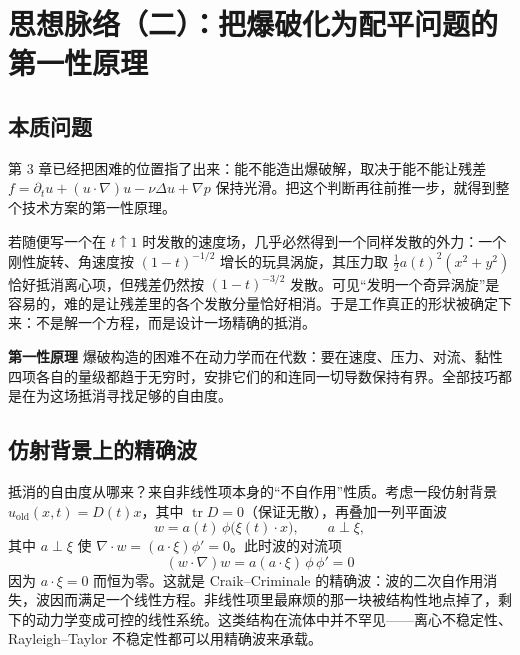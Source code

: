 
\section{思想脉络（二）：把爆破化为配平问题的第一性原理}

\subsection{本质问题}

第 3 章已经把困难的位置指了出来：能不能造出爆破解，取决于能不能让残差 $f=\partial_{t}u+(u\cdot\nabla)u-\nu\Delta u+\nabla p$ 保持光滑。把这个判断再往前推一步，就得到整个技术方案的第一性原理。

若随便写一个在 $t\uparrow1$ 时发散的速度场，几乎必然得到一个同样发散的外力：一个刚性旋转、角速度按 $(1-t)^{-1/2}$ 增长的玩具涡旋，其压力取 $\frac12 a(t)^{2}(x^{2}+y^{2})$ 恰好抵消离心项，但残差仍然按 $(1-t)^{-3/2}$ 发散。可见“发明一个奇异涡旋”是容易的，难的是让残差里的各个发散分量恰好相消。于是工作真正的形状被确定下来：不是解一个方程，而是设计一场精确的抵消。

\begin{keybox}
\textbf{第一性原理}\quad \NS{} 爆破构造的困难不在动力学而在代数：要在速度、压力、对流、黏性四项各自的量级都趋于无穷时，安排它们的和连同一切导数保持有界。全部技巧都是在为这场抵消寻找足够的自由度。
\end{keybox}

\subsection{仿射背景上的精确波}

抵消的自由度从哪来？来自非线性项本身的“不自作用”性质。考虑一段仿射背景 $u_{\text{old}}(x,t)=D(t)x$，其中 $\operatorname{tr}D=0$（保证无散），再叠加一列平面波
\begin{equation}
w=a(t)\,\phi\big(\xi(t)\cdot x\big),\qquad a\perp\xi,
\end{equation}
其中 $a\perp\xi$ 使 $\nabla\cdot w=(a\cdot\xi)\phi'=0$。此时波的对流项
\begin{equation}
(w\cdot\nabla)w=a(a\cdot\xi)\,\phi\,\phi'=0
\end{equation}
因为 $a\cdot\xi=0$ 而恒为零。这就是 Craik--Criminale 的精确波：波的二次自作用消失，波因而满足一个线性方程。非线性项里最麻烦的那一块被结构性地点掉了，剩下的动力学变成可控的线性系统。这类结构在流体中并不罕见——离心不稳定性、Rayleigh--Taylor 不稳定性都可以用精确波来承载。


